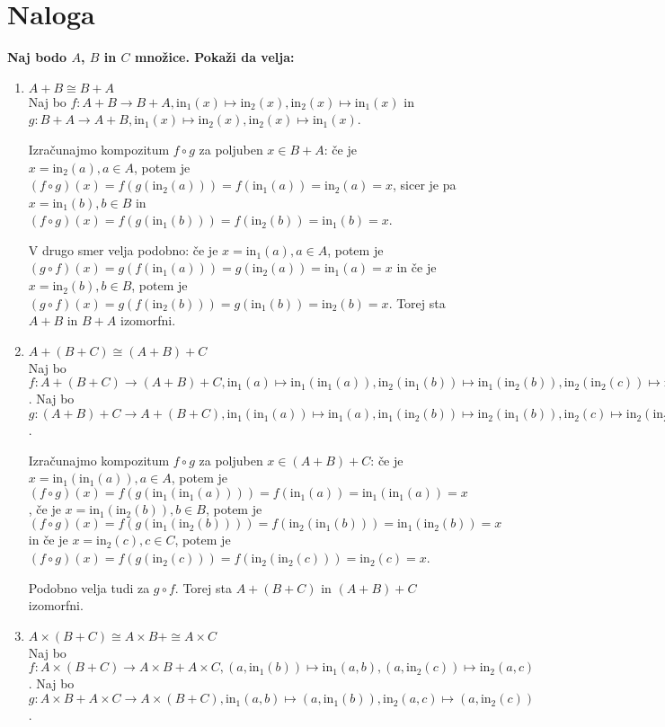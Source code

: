 \documentclass[12pt]{article}
\newcommand{\naloga}{\section{Naloga}}
\newcommand{\inj}[2][\text{}]{\text{in}_{#2}^{#1}}
\begin{document}
\naloga
    \textbf{Naj bodo \(A\), \(B\) in \(C\) množice. Pokaži da  velja:}
    \begin{enumerate}[label=(\alph*)]
        \item \(A + B \cong B + A\) \\
            Naj bo \(f : A + B \rightarrow B + A, \inj{1}(x) \mapsto \inj{2}(x), \inj{2}(x) \mapsto \inj{1}(x)\) in \(g : B + A \rightarrow A + B, \inj{1}(x) \mapsto \inj{2}(x), \inj{2}(x) \mapsto \inj{1}(x)\).

            Izračunajmo kompozitum \(f \circ g\) za poljuben \(x \in B + A\): če je \(x = \inj{2}(a), a \in A\), potem je 
            \(\left(f \circ g\right)(x) = f(g(\inj{2}(a))) = f(\inj{1}(a)) = \inj{2}(a) = x\), sicer je pa \(x = \inj{1}(b), b \in B\) in 
            \(\left(f \circ g\right)(x) = f(g(\inj{1}(b))) = f(\inj{2}(b)) = \inj{1}(b) = x\). 
            
            V drugo smer velja podobno: če je \(x = \inj{1}(a), a \in A\), potem je 
            \(\left(g \circ f\right)(x) = g\left(f\left(\inj{1}(a)\right)\right) = g\left(\inj{2}(a)\right) = \inj{1}(a) = x\) in če je \(x = \inj{2}(b), b \in B\), potem je
            \(\left(g \circ f\right)(x) = g\left(f\left(\inj{2}(b)\right)\right) = g\left(\inj{1}(b)\right) = \inj{2}(b) = x\). Torej sta \(A + B\) in \(B + A\) izomorfni.
        \item \(A + (B + C) \cong (A + B) + C\) \\
            Naj bo \(f : A + (B + C) \rightarrow (A + B) + C, \inj{1}(a) \mapsto \inj{1}(\inj{1}(a)),\allowbreak \inj{2}(\inj{1}(b)) \mapsto \inj{1}(\inj{2}(b)),\allowbreak \inj{2}(\inj{2}(c)) \mapsto \inj{2}(c)\).
            Naj bo \(g : (A + B) + C \rightarrow A + (B + C), \inj{1}(\inj{1}(a)) \mapsto \inj{1}(a),\allowbreak \inj{1}(\inj{2}(b)) \mapsto \inj{2}(\inj{1}(b)),\allowbreak \inj{2}(c) \mapsto \inj{2}(\inj{2}(c))\).

            Izračunajmo kompozitum \(f \circ g\) za poljuben \(x \in (A + B) + C\): če je \(x = \inj{1}(\inj{1}(a)), a \in A\), potem je
            \(\left(f \circ g\right)(x) = f(g(\inj{1}(\inj{1}(a)))) = f(\inj{1}(a)) = \inj{1}(\inj{1}(a)) = x\), če je \(x = \inj{1}(\inj{2}(b)), b \in B\), potem je
            \(\left(f \circ g\right)(x) = f(g(\inj{1}(\inj{2}(b)))) = f(\inj{2}(\inj{1}(b))) = \inj{1}(\inj{2}(b)) = x\) in če je \(x = \inj{2}(c), c \in C\), potem je
            \(\left(f \circ g\right)(x) = f(g(\inj{2}(c))) = f(\inj{2}(\inj{2}(c))) = \inj{2}(c) = x\).

            Podobno velja tudi za \(g \circ f\). Torej sta \(A + (B + C)\) in \((A + B) + C\) izomorfni.
        \item \(A \times \left(B + C\right) \cong A \times B + \cong A \times C\) \\
            Naj bo \(f: A \times \left(B + C\right) \rightarrow A \times B + A \times C, \left(a, \inj{1}(b)\right) \mapsto \inj{1}\left(a, b\right),
            \left(a, \inj{2}(c)\right) \mapsto \inj{2}\left(a, c\right)\). 
            Naj bo \(g: A \times B + A \times C \rightarrow A \times \left(B + C\right), \inj{1}\left(a, b\right) \mapsto \left(a, \inj{1}(b)\right),
            \inj{2}\left(a, c\right) \mapsto \left(a, \inj{2}(c)\right)\).


\end{enumerate}
\end{document}
